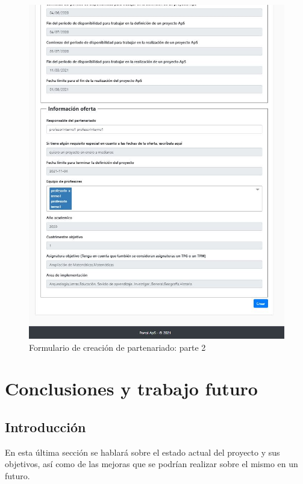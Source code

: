 \documentclass[11pt]{book}
\begin{document}
	
	\begin{figure}[t]
		\centering
		\includegraphics[scale=1]{partenariado2}
		\caption{Formulario de creación de partenariado: parte 2}
	\end{figure}
	
	
	\chapter{Conclusiones y trabajo futuro}
	\section{Introducción}
	En esta última sección se hablará sobre el estado actual del proyecto y sus objetivos, así como de las mejoras que se podrían realizar sobre el mismo en un futuro.\\\\
	
\end{document}
